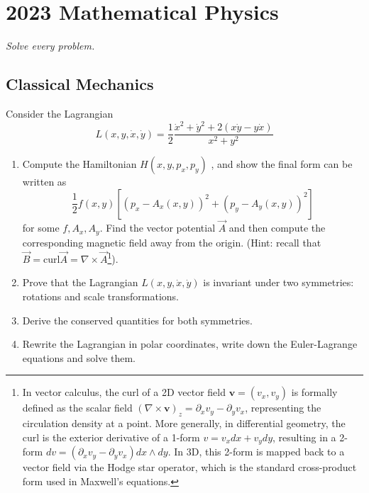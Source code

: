 \section{2023 Mathematical Physics}

\textit{Solve every problem.}

\subsection{Classical Mechanics}

\begin{exercise}
\label{physics:2023:1}
Consider the Lagrangian
\begin{equation}
    L (x, y, \dot {x}, \dot {y}) = \frac {1}{2} \frac {\dot {x} ^ {2} + \dot {y} ^ {2} + 2 (x \dot {y} - y \dot {x})}{x ^ {2} + y ^ {2}} \label{eq:2023:1:1}
\end{equation}

\begin{enumerate}[label=(\alph*)]
    \item Compute the Hamiltonian $H ( x , y , p _ { x } , p _ { y } )$ , and show the final form can be written as
    \begin{equation}
        \frac {1}{2} f (x, y) \left[ \left(p _ {x} - A _ {x} (x, y)\right) ^ {2} + \left(p _ {y} - A _ {y} (x, y)\right) ^ {2} \right] \label{eq:2023:1:2}
    \end{equation}
    for some $f , A _ { x } , A _ { y }$. Find the vector potential $\vec { A }$ and then compute the corresponding magnetic field away from the origin. (Hint: recall that $\vec { B } = \mathrm { curl } \vec { A } = \nabla \times \vec { A }$\footnote{In vector calculus, the curl of a 2D vector field $\mathbf{v} = (v_x, v_y)$ is formally defined as the scalar field $(\nabla \times \mathbf{v})_z = \partial_x v_y - \partial_y v_x$, representing the circulation density at a point. More generally, in differential geometry, the curl is the exterior derivative of a 1-form $v = v_x dx + v_y dy$, resulting in a 2-form $dv = (\partial_x v_y - \partial_y v_x) dx \wedge dy$. In 3D, this 2-form is mapped back to a vector field via the Hodge star operator, which is the standard cross-product form used in Maxwell's equations.}).
    \item Prove that the Lagrangian $L ( x , y , \dot { x } , \dot { y } )$ is invariant under two symmetries: rotations and scale transformations.
    \item Derive the conserved quantities for both symmetries.
    \item Rewrite the Lagrangian in polar coordinates, write down the Euler-Lagrange equations and solve them.
\end{enumerate}
\end{exercise}

